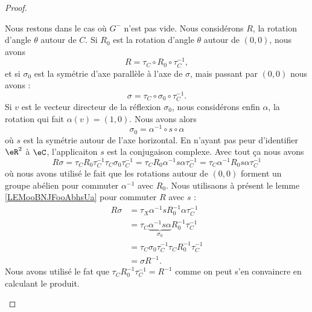 \begin{proof}
\begin{subproof}
\begin{subproof}
                Nous restons dans le cas où \( G^-\) n'est pas vide. Nous considérons \( R\), la rotation d'angle \( \theta\) autour de \( C\). Si \( R_0\) est la rotation d'angle \( \theta\) autour de \( (0,0)\), nous avons
                \begin{equation}
                    R=\tau_C\circ R_0\circ \tau_C^{-1},
                \end{equation}
                et si \( \sigma_0\) est la symétrie d'axe parallèle à l'axe de \( \sigma\), mais passant par \( (0,0)\) nous avons : 
                \begin{equation}
                    \sigma=\tau_C\circ\sigma_0\circ\tau_C^{-1}.
                \end{equation}
                Si \( v\) est le vecteur directeur de la réflexion \( \sigma_0\), nous considérons enfin \( \alpha\), la rotation qui fait \( \alpha(v)=(1,0)\). Nous avons alors
                \begin{equation}
                    \sigma_0=\alpha^{-1}\circ s\circ \alpha
                \end{equation}
                où \( s\) est la symétrie autour de l'axe horizontal. En n'ayant pas peur d'identifier \( \eR^2\) à \( \eC\), l'applicaiton \( s\) est la conjugaison complexe. Avec tout ça nous avons
                \begin{equation}
                    R\sigma=\tau_CR_0\tau_C^{-1}\tau_C\sigma_0\tau_C^{-1}=\tau_CR_0\alpha^{-1}s\alpha\tau_C^{-1}=\tau_C\alpha^{-1}R_0s\alpha\tau_C^{-1}
                \end{equation}
                où nous avons utilisé le fait que les rotations autour de \( (0,0)\) forment un groupe abélien pour commuter \( \alpha^{-1}\) avec \( R_0\). Nous utilisaons à présent le lemme \ref{LEMooBNJFooAbhsUa} pour commuter \( R\) avec \( s\) :
                \begin{subequations}
                    \begin{align}
                        R\sigma&=\tau_X\alpha^{-1}sR_0^{-1}\alpha\tau_C^{-1}\\
                        &=\tau_C\underbrace{\alpha^{-1}s\alpha}_{\sigma_0} R_0^{-1}\tau_C^{-1}\\
                        &=\tau_C\sigma_0\tau_C^{-1}\tau_CR_0^{-1}\tau_C^{-1}\\
                        &=\sigma R^{-1}.
                    \end{align}
                \end{subequations}
                Nous avons utilisé le fat que \( \tau_CR_0^{-1}\tau_C^{-1}=R^{-1}\) comme on peut s'en convaincre en calculant le produit.


\end{subproof}
\end{subproof}
\end{proof}
